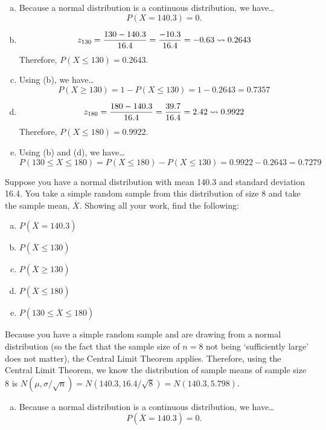\documentclass[12pt,letterpaper]{exam}
\begin{document}
\begin{questions}
\sol 
\begin{enumerate}[(a)]
\item Because a normal distribution is a continuous distribution, we have\dots
	\[
	P(X= 140.3)= 0.
	\] \pspace

\item 
	\[
	z_{130}= \dfrac{130 - 140.3}{16.4}= \dfrac{-10.3}{16.4}= -0.63 \rightsquigarrow 0.2643
	\]
Therefore, $P(X \leq 130)= 0.2643$. \pspace

\item Using (b), we have\dots
	\[
	P(X \geq 130)= 1 - P(X \leq 130)= 1 - 0.2643= 0.7357
	\] \pspace

\item 
	\[
	z_{180}= \dfrac{180 - 140.3}{16.4}= \dfrac{39.7}{16.4}= 2.42 \rightsquigarrow 0.9922 
	\] 
Therefore, $P(X \leq 180)= 0.9922$. \pspace

\item Using (b) and (d), we have\dots
	\[
	P(130 \leq X \leq 180)= P(X \leq 180) - P(X \leq 130)= 0.9922 - 0.2643= 0.7279
	\]
\end{enumerate}



\newpage
\question[10] Suppose you have a normal distribution with mean 140.3 and standard deviation 16.4. You take a simple random sample from this distribution of size 8 and take the sample mean, $\overline{X}$. Showing all your work, find the following:
	\begin{enumerate}[(a)]
	\item $P(\overline{X}= 140.3)$
	\item $P(\overline{X} \leq 130)$
	\item $P(\overline{X} \geq 130)$
	\item $P(\overline{X} \leq 180)$
	\item $P(130 \leq \overline{X} \leq 180)$
	\end{enumerate} \pspace

\sol Because you have a simple random sample and are drawing from a normal distribution (so the fact that the sample size of $n= 8$ not being `sufficiently large' does not matter), the Central Limit Theorem applies. Therefore, using the Central Limit Theorem, we know the distribution of sample means of sample size $8$ is $N(\mu, \sigma/\sqrt{n})= N(140.3, 16.4/\sqrt{8})= N(140.3, 5.798)$. 

\begin{enumerate}[(a)]
\item Because a normal distribution is a continuous distribution, we have\dots
	\[
	P(\overline{X}= 140.3)= 0.
	\] \pspace


\end{enumerate}
\end{questions}
\end{document}
